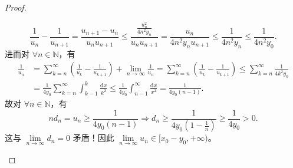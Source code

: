 \documentclass[../../main.tex]{subfiles}%
\begin{document}
\begin{proof}
\begin{enumerate}[(1)]
\[
\frac{1}{u_n} - \frac{1}{u_{n+1}} = \frac{u_{n+1} - u_n}{u_n u_{n+1}} \leqslant \frac{\frac{u_n^2}{4n^2 y_n}}{u_n u_{n+1}} = \frac{u_n}{4n^2 y_n u_{n+1}} \leqslant \frac{1}{4n^2 y_n} \leqslant \frac{1}{4n^2 y_0}.
\]
进而对 $\forall n \in \mathbb{N}$，有
\begin{align*}
\frac{1}{u_n} &= \sum_{k=n}^{\infty} \left( \frac{1}{u_k} - \frac{1}{u_{k+1}} \right) + \lim\limits_{n \to \infty} \frac{1}{u_n} = \sum_{k=n}^{\infty} \left( \frac{1}{u_k} - \frac{1}{u_{k+1}} \right) \leqslant \sum_{k=n}^{\infty} \frac{1}{4k^2 y_0}
\\
&= \frac{1}{4y_0}\sum_{k=n}^{\infty} \int_{k-1}^k \frac{\mathrm{d}x}{k^2} \leqslant \frac{1}{4y_0}\int_{n-1}^{\infty} \frac{\mathrm{d}x}{x^2} = \frac{1}{4y_0(n-1)}.
\end{align*}
故对 $\forall n \in \mathbb{N}$，有
\[
nd_n = u_n \geqslant \frac{1}{4y_0(n-1)} \Longrightarrow d_n \geqslant \frac{1}{4y_0\left(1 - \frac{1}{n}\right)} \geqslant \frac{1}{4y_0} > 0.
\]
这与 $\lim\limits_{n \to \infty} d_n = 0$ 矛盾！因此 $\lim\limits_{n \to \infty} u_n \in [x_0 - y_0, +\infty)$。
\end{enumerate}

\end{proof}
\end{document}
